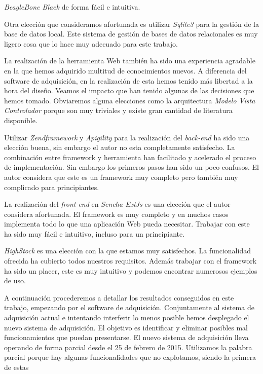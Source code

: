 	\emph{BeagleBone Black} de forma fácil e intuitiva.    
	\par
	Otra elección que consideramos afortunada es utilizar \emph{Sqlite3}\cite{Sqlite} para la gestión de la base de datos local. Este sistema de gestión
	de bases de datos relacionales es muy ligero cosa que lo hace muy adecuado para este trabajo.
	\par
	La realización de la herramienta Web también ha sido una experiencia agradable en la que hemos adquirido multitud de conocimientos nuevos. A
	diferencia del software de adquisición, en la realización de esta hemos tenido más libertad a la hora del diseño. Veamos el impacto que han
	tenido algunas de las decisiones que hemos tomado. Obviaremos alguna elecciones como la arquitectura \emph{Modelo Vista Controlador} porque
	son muy triviales y existe gran cantidad de literatura disponible.
	\par
	Utilizar \emph{Zendframework} y \emph{Apigility} para la realización del \emph{back-end} ha sido una elección buena, sin embargo el autor no esta
	completamente satisfecho. La combinación entre framework y herramienta han facilitado y acelerado el proceso de implementación. Sin embargo
	los primeros pasos han sido un poco confusos. El autor considera que este es un framework muy completo pero también muy complicado para
	principiantes.
	\par
	La realización del \emph{front-end} en \emph{Sencha ExtJs} es una elección que el autor considera afortunada. El framework es muy completo y en
	muchos casos implementa todo lo que una aplicación Web pueda necesitar. Trabajar con este ha sido muy fácil e intuitivo, incluso para un
	principiante. 
	\par
	\emph{HighStock} es una elección con la que estamos muy satisfechos. La funcionalidad ofrecida ha cubierto todos nuestros requisitos. Además trabajar
	con el framework ha sido un placer, este es muy intuitivo y podemos encontrar numerosos ejemplos de uso.
	\par
	A continuación procederemos a detallar los resultados conseguidos en este trabajo, empezando por el software de adquisición. Conjuntamente al
	sistema de adquisición actual e intentando interferir lo menos posible hemos desplegado el nuevo sistema de adquisición. El objetivo es
	identificar y eliminar posibles mal funcionamientos que puedan presentarse. El nuevo sistema de adquisición lleva operando de forma parcial
	desde el 25 de febrero de 2015. Utilizamos la palabra parcial porque hay algunas funcionalidades que no explotamos, siendo la primera de estas

